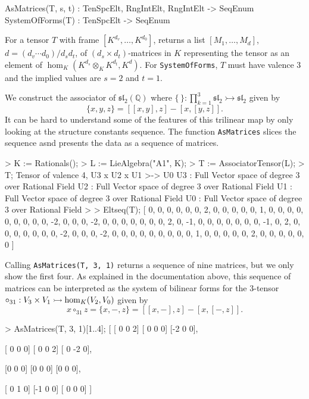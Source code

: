\begin{intrinsics}
AsMatrices(T, s, t) : TenSpcElt, RngIntElt, RngIntElt -> SeqEnum
SystemOfForms(T) : TenSpcElt -> SeqEnum
\end{intrinsics}

For a tensor $T$ with frame $[K^{d_v},\dots,K^{d_0}]$, 
returns a list $[M_1,\dots,M_d]$, $d=(d_v\cdots d_0)/d_s d_t$, 
of $(d_s\times d_t)$-matrices in $K$ representing the tensor
as an element of $\hom_K(K^{d_s}\otimes_K K^{d_t},K^d)$.
For {\tt SystemOfForms}, $T$ must have valence $3$ and the implied values
are $s=2$ and $t=1$.


\begin{example}[TrilinearAsMats]

We construct the associator of $\mathfrak{sl}_2(\mathbb{Q})$ where $\{ \, \} : \prod_{k=1}^3\mathfrak{sl}_2\rightarrowtail \mathfrak{sl}_2$ given by
\[ \{ x,y,z \} = [[x,y],z] - [x,[y,z]]. \]
It can be hard to understand some of the features of this trilinear map by only looking at the structure constants sequence. 
The function {\tt AsMatrices} slices the sequence asnd presents the data as a sequence of matrices.
\begin{code}
> K := Rationals();
> L := LieAlgebra("A1", K);
> T := AssociatorTensor(L);
> T;
Tensor of valence 4, U3 x U2 x U1 >-> U0
U3 : Full Vector space of degree 3 over Rational Field
U2 : Full Vector space of degree 3 over Rational Field
U1 : Full Vector space of degree 3 over Rational Field
U0 : Full Vector space of degree 3 over Rational Field
>
> Eltseq(T);
[ 0, 0, 0, 0, 0, 0, 2, 0, 0, 0, 0, 0, 1, 0, 0, 0, 0, 0, 0, 0, 0, 0, -2,
0, 0, 0, -2, 0, 0, 0, 0, 0, 0, 0, 2, 0, -1, 0, 0, 0, 0, 0, 0, 0, -1, 0,
2, 0, 0, 0, 0, 0, 0, 0, -2, 0, 0, 0, -2, 0, 0, 0, 0, 0, 0, 0, 0, 0, 1, 
0, 0, 0, 0, 0, 2, 0, 0, 0, 0, 0, 0 ]
\end{code}

Calling {\tt AsMatrices(T, 3, 1)} returns a sequence of nine matrices, but we only show the first four.
As explained in the documentation above, this sequence of matrices can be interpreted as the system of bilinear forms for the 3-tensor $\circ_{31} : V_3 \times V_1 \rightarrowtail \operatorname{hom}_K(V_2,V_0)$ given by
\[ x\circ_{31} z = \{ x, -,z \} = [[x,-],z] - [x,[-,z]].\]

\begin{code}
> AsMatrices(T, 3, 1)[1..4];
[
    [ 0  0  2]
    [ 0  0  0]
    [-2  0  0],

    [ 0  0  0]
    [ 0  0  2]
    [ 0 -2  0],

    [0 0 0]
    [0 0 0]
    [0 0 0],

    [ 0  1  0]
    [-1  0  0]
    [ 0  0  0]
]
\end{code}
\end{example}



